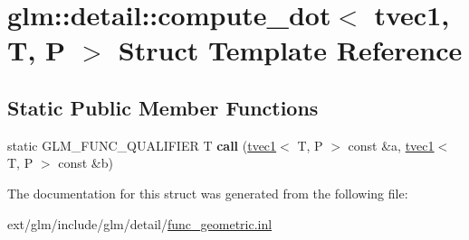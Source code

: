 \hypertarget{structglm_1_1detail_1_1compute__dot_3_01tvec1_00_01_t_00_01_p_01_4}{\section{glm\-:\-:detail\-:\-:compute\-\_\-dot$<$ tvec1, T, P $>$ Struct Template Reference}
\label{structglm_1_1detail_1_1compute__dot_3_01tvec1_00_01_t_00_01_p_01_4}
}
\subsection*{Static Public Member Functions}
\begin{DoxyCompactItemize}
\item 
\hypertarget{structglm_1_1detail_1_1compute__dot_3_01tvec1_00_01_t_00_01_p_01_4_a5d60ac85933e9dca62ed99875ec17f11}{static G\-L\-M\-\_\-\-F\-U\-N\-C\-\_\-\-Q\-U\-A\-L\-I\-F\-I\-E\-R T {\bfseries call} (\hyperlink{structglm_1_1tvec1}{tvec1}$<$ T, P $>$ const \&a, \hyperlink{structglm_1_1tvec1}{tvec1}$<$ T, P $>$ const \&b)}\label{structglm_1_1detail_1_1compute__dot_3_01tvec1_00_01_t_00_01_p_01_4_a5d60ac85933e9dca62ed99875ec17f11}

\end{DoxyCompactItemize}


The documentation for this struct was generated from the following file\-:\begin{DoxyCompactItemize}
\item 
ext/glm/include/glm/detail/\hyperlink{func__geometric_8inl}{func\-\_\-geometric.\-inl}\end{DoxyCompactItemize}

